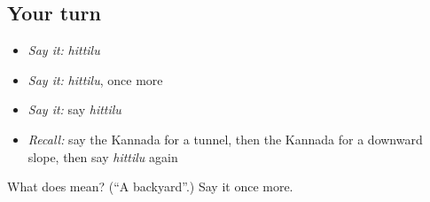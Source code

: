 \subsection*{Your turn}
\begin{itemize}
\raggedright
  \item \emph{Say it:} \emph{hittilu}
  \item \emph{Say it:} \emph{hittilu}, once more
  \item \emph{Say it:} say \emph{hittilu}
  \item \emph{Recall:} say the Kannada for a tunnel, then the Kannada for a downward slope, then say \emph{hittilu} again
\end{itemize}

\begin{tcolorbox}[breakable,colback=teal!4,colframe=teal!35!black,title={Before you move on}]
What does  mean? (\textquotedblleft{}A backyard\textquotedblright{}.) Say it once more.
\end{tcolorbox}
